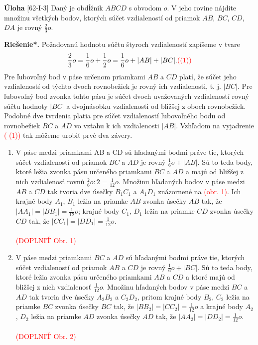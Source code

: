 \documentclass{article}
\newcommand{\rieh}{\textbf{Riešenie*.} }
\newcommand\todo[1]{\noindent\textcolor{red}{(#1)}}
\newcommand{\problem}[4]{
  \begin{tcolorbox}[breakable,notitle,boxrule=0pt,colback=light-gray,colframe=light-gray]
    \textbf{Úloha}
    [#1] #3
  \end{tcolorbox}
  \noindent#4
}
\begin{document}
\problem{62-I-3}{}{
Daný je obdĺžnik $ABCD$ s obvodom $o$. V jeho rovine nájdite množinu všetkých bodov, ktorých súčet vzdialeností od priamok $AB$, $BC$, $CD$, $DA$ je rovný $\frac{2}{3}o$.
}{
\rieh Požadovanú hodnotu súčtu štyroch vzdialeností zapíšeme v tvare
$$ \frac{2}{3}o = \frac{1}{6}o +\frac{1}{2}o =\frac{1}{6}o + |AB| + |BC|. \todo{(1)}$$
Pre ľubovoľný bod v páse určenom priamkami $AB$ a $CD$ platí, že súčet jeho vzdialeností od týchto dvoch rovnobežiek je rovný ich vzdialenosti, t. j. $|BC|$. Pre ľubovoľný bod zvonka tohto pásu je súčet dvoch uvažovaných vzdialeností rovný súčtu hodnoty $|BC|$ a dvojnásobku vzdialenosti od bližšej z oboch rovnobežiek. Podobné dve tvrdenia platia pre súčet vzdialeností ľubovoľného bodu od rovnobežiek $BC$ a $AD$ vo vzťahu k ich vzdialenosti $|AB|$. Vzhľadom na vyjadrenie \todo{ (1)} tak môžeme urobiť prvé dva závery.

\begin{enumerate}[(1)]
    \item  V páse medzi priamkami AB a CD sú hľadanými bodmi práve tie, ktorých súčet vzdialeností od priamok $BC$ a $AD$ je rovný $\frac{1}{6}o + |AB|$. Sú to teda body, ktoré ležia zvonka pásu určeného priamkami $BC$ a $AD$ a majú od bližšej z nich vzdialenosť rovnú $\frac{2}{6}o : 2 = \frac{1}{12}o$. Množinu hľadaných bodov v páse medzi $AB$ a $CD$ tak tvoria dve úsečky $B_1 C_1$ a $A_1 D_1$ znázornené na \todo{obr. 1}. Ich krajné body $A_1$, $B_1$ ležia na priamke $AB$ zvonka úsečky $AB$ tak, že $|AA_1 | = |BB_1 | =\frac{1}{12}o$; krajné body $C_1$, $D_1$ ležia na priamke $CD$ zvonka úsečky $CD$ tak, že $|CC_1 | = |DD_1 | = \frac{1}{12}o$.\\
    \\
    \todo{DOPLNIŤ Obr. 1}

    \item V páse medzi priamkami $BC$ a $AD$ sú hľadanými bodmi práve tie, ktorých súčet vzdialeností od priamok $AB$ a $CD$ je rovný $\frac{1}{6}o + |BC|$. Sú to teda body, ktoré ležia zvonka pásu určeného priamkami $AB$ a $CD$ a ktoré majú od bližšej z nich vzdialenosť $\frac{1}{12}o$. Množinu hľadaných bodov v páse medzi $BC$ a $AD$ tak tvoria dve úsečky $A_2 B_2$ a $C_2 D_2$, pritom krajné body $B_2$, $C_2$ ležia na priamke $BC$ zvonka úsečky $BC$ tak, že $|BB_2 | = |CC_2 | =\frac{1}{12}o$ a krajné body $A_2$, $D_2$ ležia na priamke $AD$ zvonka úsečky $AD$ tak, že $|AA_2 | = |DD_2 | =\frac{1}{12}o$. \\
    \\
    \todo{DOPLNIŤ Obr. 2}


\end{enumerate}}
\end{document}

